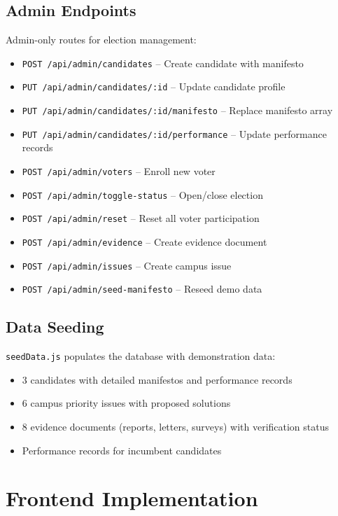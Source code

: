 \subsection{Admin Endpoints}
\label{sec:admin-endpoints}

Admin-only routes for election management:

\begin{itemize}
    \item \texttt{POST /api/admin/candidates} -- Create candidate with manifesto
    \item \texttt{PUT /api/admin/candidates/:id} -- Update candidate profile
    \item \texttt{PUT /api/admin/candidates/:id/manifesto} -- Replace manifesto array
    \item \texttt{PUT /api/admin/candidates/:id/performance} -- Update performance records
    \item \texttt{POST /api/admin/voters} -- Enroll new voter
    \item \texttt{POST /api/admin/toggle-status} -- Open/close election
    \item \texttt{POST /api/admin/reset} -- Reset all voter participation
    \item \texttt{POST /api/admin/evidence} -- Create evidence document
    \item \texttt{POST /api/admin/issues} -- Create campus issue
    \item \texttt{POST /api/admin/seed-manifesto} -- Reseed demo data
\end{itemize}

\subsection{Data Seeding}
\label{sec:seeding}

\texttt{seedData.js} populates the database with demonstration data:
\begin{itemize}
    \item 3 candidates with detailed manifestos and performance records
    \item 6 campus priority issues with proposed solutions
    \item 8 evidence documents (reports, letters, surveys) with verification status
    \item Performance records for incumbent candidates
\end{itemize}

\section{Frontend Implementation}
\label{sec:frontend-impl}

